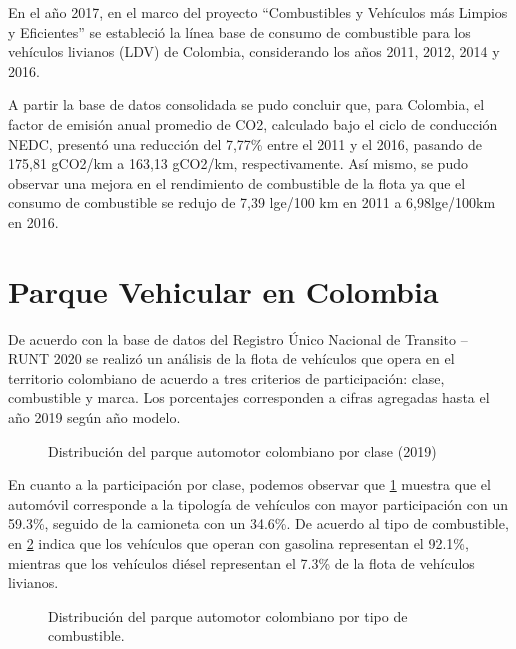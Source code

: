 En el año 2017, en el marco del proyecto “Combustibles y Vehículos más Limpios y Eficientes” se estableció la línea base de consumo de combustible para los vehículos livianos (LDV) de Colombia, considerando los años 2011, 2012, 2014 y 2016. \cite{Baseline_Pereira_2020}

A partir la base de datos consolidada se pudo concluir que, para Colombia, el factor de emisión anual promedio de CO2, calculado bajo el ciclo de conducción NEDC, presentó una reducción del 7,77\% entre el 2011 y el 2016, pasando de 175,81 gCO2/km a 163,13 gCO2/km, respectivamente. Así mismo, se pudo observar una mejora en el rendimiento de combustible de la flota ya que el consumo de combustible se redujo de 7,39 lge/100 km en 2011 a 6,98lge/100km en 2016.\cite{Baseline_Pereira_2020}


\section{Parque Vehicular en Colombia}

De acuerdo con la base de datos del Registro Único Nacional de Transito – RUNT 2020 se realizó un análisis de la flota de vehículos que opera en el territorio colombiano de acuerdo a tres criterios de participación: clase, combustible y marca. Los porcentajes corresponden a cifras agregadas hasta el año 2019 según año modelo.

 \begin{figure}[htbp]
   \centering
   
    \caption{Distribución del parque automotor colombiano por clase (2019) \cite{ICCT_Performance_2020}}
    \label{fig:linebaseclase}
\end{figure}

En cuanto a la participación por clase, podemos observar que \ref{fig:linebaseclase} muestra que el automóvil corresponde a la tipología de vehículos con mayor participación con un 59.3\%, seguido de la camioneta con un 34.6\%. De acuerdo al tipo de combustible, en \ref{fig:linebasecomb} indica que los vehículos que operan con gasolina representan el 92.1\%, mientras que los vehículos diésel representan el 7.3\% de la flota de vehículos livianos.

 \begin{figure}[htbp]
   \centering
   
    \caption{Distribución del parque automotor colombiano por tipo de combustible. \cite{ICCT_Performance_2020}}
    \label{fig:linebasecomb}
\end{figure}

